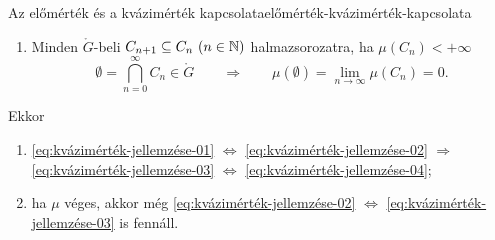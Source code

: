 \documentclass[
]{elteikthesis}[2024/04/26]
\begin{document}
\begin{theorem}{Az előmérték és a kvázimérték kapcsolata}{előmérték-kvázimérték-kapcsolata}
\begin{enumerate}[label=\alph*)]
			\item{}\label{eq:kvázimérték-jellemzése-04} 
			Minden \( \ring{G} \)-beli \( C_{n + 1} \subseteq C_n \ (n \in \mathbb{N}) \)
			halmazsorozatra, ha \( \mu(C_n) < +\infty \)
			\[
			\emptyset = \bigcap_{n=0}^{\infty} C_n \in \ring{G}
			\qquad \Longrightarrow \qquad
			\mu(\emptyset) = \lim_{n \to \infty} \mu(C_n) = 0.
			\]
		\end{enumerate}
		Ekkor
		\begin{enumerate}
			\item 
			\ref{eq:kvázimérték-jellemzése-01} \( \Longleftrightarrow \)
			\ref{eq:kvázimérték-jellemzése-02} \( \Longrightarrow \)
			\ref{eq:kvázimérték-jellemzése-03} \( \Longleftrightarrow \)
			\ref{eq:kvázimérték-jellemzése-04};
			
			\item ha \( \mu \) véges, akkor még 
			\ref{eq:kvázimérték-jellemzése-02} \( \Longleftrightarrow \)
			\ref{eq:kvázimérték-jellemzése-03} is fennáll.
		\end{enumerate}
	\end{theorem}
\end{document}
